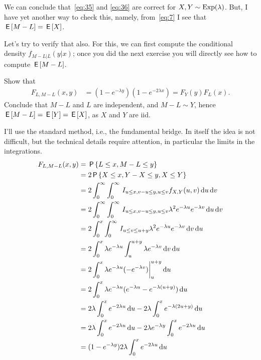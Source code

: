 \documentclass[a4paper,11pt]{article}
\begin{document}
We can conclude that~\cref{eq:35} and \cref{eq:36} are correct for $X,Y\sim\mathrm{Exp}(\lambda)$.
But, I have yet another way to check this, namely, from~\cref{eq:7} I see that $\,\mathsf{E}\left[M-L\right] = \,\mathsf{E}\left[X\right]$.

Let's try to verify that also.
For this, we can first compute the conditional density $f_{M-L| L}(y| x)$; once you did the next exercise you will directly see how to compute $\,\mathsf{E}\left[M-L\right]$.

\begin{exercise}\label{ex:5}
Show that
\begin{align}  \label{eq:23}
F_{L,M-L}(x,y) &= (1-e^{-\lambda y})(1- e^{-2\lambda x}) = F_Y(y) F_L(x).
\end{align}
Conclude that $M-L$ and $L$ are independent, and $M-L\sim Y$, hence $\,\mathsf{E}\left[M-L\right] = \,\mathsf{E}\left[Y\right] = \,\mathsf{E}\left[X\right]$, as $X$ and $Y$ are iid.
\begin{solution}
I'll use the standard method, i.e., the fundamental bridge.
In itself the idea is not difficult, but the technical details require attention, in particular the limits in the integrations.
\begin{align}
F_{L, M-L}(x, y)
&=\P{L\leq x, M-L\leq y}\\
&= 2\P{X\leq x, Y-X \leq y, X \leq Y} \\
&= 2\int_0^{\infty} \int_0^{\infty} \1{u\leq x, v-u\leq y, u \leq v} f_{X,Y}(u, v)  \d u \d v\\
&= 2\int_0^{\infty} \int_0^{\infty} \1{u\leq x, v-u\leq y, u\leq v} \lambda^2e^{-\lambda u}e^{-\lambda v}\d u \d v\\
&= 2\int_0^{x} \int_0^{\infty} \1{u\leq v\leq u+y} \lambda^2e^{-\lambda u}e^{-\lambda v}\d v \d u\\
&= 2\int_0^{x} \lambda e^{-\lambda u} \int_u   ^{u + y}  \lambda e^{-\lambda v}\d v \d u\\
&= 2\int_0^{x} \lambda e^{-\lambda u} (-e^{-\lambda v}) \biggr|_u^{u+y}\d u \\
&= 2\int_0^{x} \lambda e^{-\lambda u} (e^{-\lambda u} - e^{-\lambda (u+y)})\d u \\
&= 2\lambda\int_0^{x}  e^{-2 \lambda u}\d u  - 2\lambda \int_{0}^{x} e^{-\lambda (2u+y)}\d u \\
&= 2\lambda\int_0^{x}  e^{-2 \lambda u}\d u  - 2\lambda e^{-\lambda y }\int_{0}^{x} e^{-2 \lambda u}\d u \\
&= (1-e^{-\lambda y}) 2 \lambda \int_0^{x} e^{-2 \lambda u} \d u\\

\end{align}
\end{solution}
\end{exercise}
\end{document}
